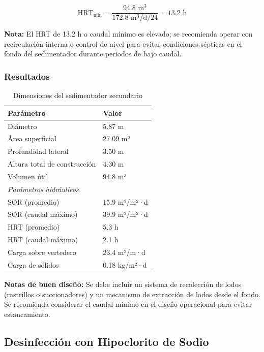 \documentclass[12pt,a4paper]{article}
\begin{document}
\begin{equation}
\text{HRT}_{\min} = \frac{94.8 \text{ m}^3}{172.8 \text{ m}^3\text{/d} / 24} = 13.2 \text{ h}
\end{equation}

\textbf{Nota:} El HRT de 13.2 h a caudal mínimo es elevado; se recomienda operar con recirculación interna o control de nivel para evitar condiciones sépticas en el fondo del sedimentador durante periodos de bajo caudal.

\subsubsection{Resultados}

\begin{table}[H]
\centering
\caption{Dimensiones del sedimentador secundario}
\begin{tabular}{ll}
\toprule
Parámetro & Valor \\
\midrule
Diámetro & 5.87 m \\
Área superficial & 27.09 m² \\
Profundidad lateral & 3.50 m \\
Altura total de construcción & 4.30 m \\
Volumen útil & 94.8 m³ \\
\midrule
\multicolumn{2}{l}{\textit{Parámetros hidráulicos}} \\
\midrule
SOR (promedio) & 15.9 m³/m²·d \\
SOR (caudal máximo) & 39.9 m³/m²·d \\
HRT (promedio) & 5.3 h \\
HRT (caudal máximo) & 2.1 h \\
Carga sobre vertedero & 23.4 m³/m·d \\
Carga de sólidos & 0.18 kg/m²·d \\
\bottomrule
\end{tabular}
\end{table}

\textbf{Notas de buen diseño:} Se debe incluir un sistema de recolección de lodos (rastrillos o succionadores) y un mecanismo de extracción de lodos desde el fondo. Se recomienda considerar el caudal mínimo en el diseño operacional para evitar estancamiento.

\subsection{Desinfección con Hipoclorito de Sodio}
\end{document}
